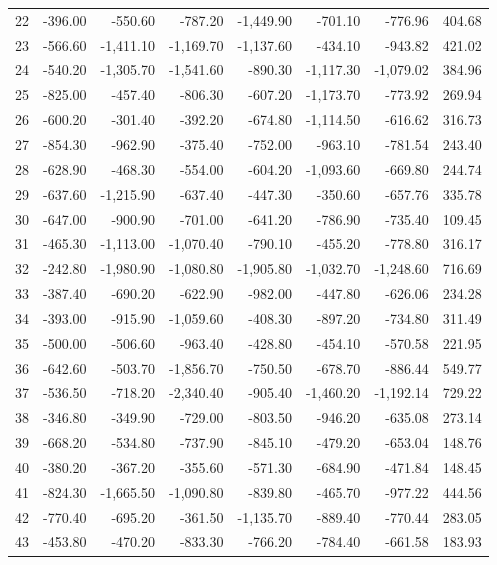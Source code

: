 \begin{longtable}{rrrrrrrr}
22 & -396.00 & -550.60 & -787.20 & -1,449.90 & -701.10 & -776.96 & 404.68  \\
23 & -566.60 & -1,411.10 & -1,169.70 & -1,137.60 & -434.10 & -943.82 & 421.02  \\
24 & -540.20 & -1,305.70 & -1,541.60 & -890.30 & -1,117.30 & -1,079.02 & 384.96  \\
25 & -825.00 & -457.40 & -806.30 & -607.20 & -1,173.70 & -773.92 & 269.94  \\
26 & -600.20 & -301.40 & -392.20 & -674.80 & -1,114.50 & -616.62 & 316.73  \\
27 & -854.30 & -962.90 & -375.40 & -752.00 & -963.10 & -781.54 & 243.40  \\
28 & -628.90 & -468.30 & -554.00 & -604.20 & -1,093.60 & -669.80 & 244.74  \\
29 & -637.60 & -1,215.90 & -637.40 & -447.30 & -350.60 & -657.76 & 335.78  \\
30 & -647.00 & -900.90 & -701.00 & -641.20 & -786.90 & -735.40 & 109.45  \\
31 & -465.30 & -1,113.00 & -1,070.40 & -790.10 & -455.20 & -778.80 & 316.17  \\
32 & -242.80 & -1,980.90 & -1,080.80 & -1,905.80 & -1,032.70 & -1,248.60 & 716.69  \\
33 & -387.40 & -690.20 & -622.90 & -982.00 & -447.80 & -626.06 & 234.28  \\
34 & -393.00 & -915.90 & -1,059.60 & -408.30 & -897.20 & -734.80 & 311.49  \\
35 & -500.00 & -506.60 & -963.40 & -428.80 & -454.10 & -570.58 & 221.95  \\
36 & -642.60 & -503.70 & -1,856.70 & -750.50 & -678.70 & -886.44 & 549.77  \\
37 & -536.50 & -718.20 & -2,340.40 & -905.40 & -1,460.20 & -1,192.14 & 729.22  \\
38 & -346.80 & -349.90 & -729.00 & -803.50 & -946.20 & -635.08 & 273.14  \\
39 & -668.20 & -534.80 & -737.90 & -845.10 & -479.20 & -653.04 & 148.76  \\
40 & -380.20 & -367.20 & -355.60 & -571.30 & -684.90 & -471.84 & 148.45  \\
41 & -824.30 & -1,665.50 & -1,090.80 & -839.80 & -465.70 & -977.22 & 444.56  \\
42 & -770.40 & -695.20 & -361.50 & -1,135.70 & -889.40 & -770.44 & 283.05  \\
43 & -453.80 & -470.20 & -833.30 & -766.20 & -784.40 & -661.58 & 183.93  \\

\end{longtable}
